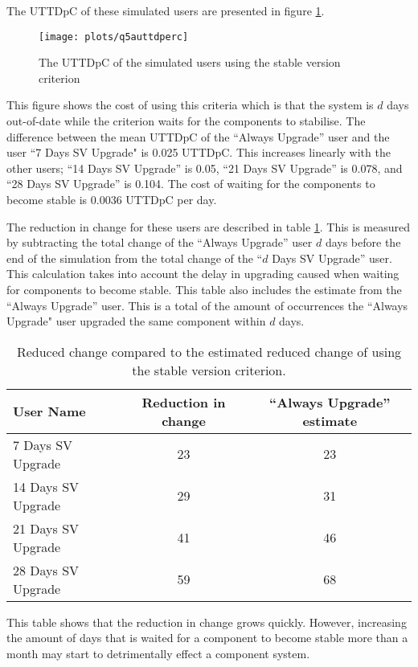 The UTTDpC of these simulated users are presented in figure \ref{exp.q5auttdperc}.
\begin{figure}[htp]
\begin{center}
  \texttt{[image: plots/q5auttdperc]}
  \caption{The UTTDpC of the simulated users using the stable version criterion}
  \label{exp.q5auttdperc}
\end{center}
\end{figure}

This figure shows the cost of using this criteria which is that the system is $d$ days out-of-date while the criterion waits for the components to stabilise.
The difference between the mean UTTDpC of the ``Always Upgrade'' user and the user ``7 Days SV Upgrade" is 0.025 UTTDpC.
This increases linearly with the other users; ``14 Days SV Upgrade'' is 0.05, ``21 Days SV Upgrade'' is 0.078, and ``28 Days SV Upgrade'' is 0.104.
The cost of waiting for the components to become stable is 0.0036 UTTDpC per day.

The reduction in change for these users are described in table \ref{exp.tblsvchange}.
This is measured by subtracting the total change of the ``Always Upgrade'' user $d$ days before the end of the simulation
from the total change of the  ``$d$ Days SV Upgrade'' user.
This calculation takes into account the delay in upgrading caused when waiting for components to become stable.
This table also includes the estimate from the ``Always Upgrade'' user.
This is a total of the amount of occurrences the ``Always Upgrade" user upgraded the same component within $d$ days.
\begin{table}[h!]
\centering
\begin{tabular}{|l | c | c | }
\hline
User Name 				& Reduction in change 	& ``Always Upgrade'' estimate		\\ \hline
7 Days SV Upgrade		& 23 					& 23 			 \\
14 Days SV Upgrade		& 29	 				& 31			\\
21 Days SV Upgrade		& 41 					& 46 			 \\
28 Days SV Upgrade 		& 59 					& 68			\\ \hline
\end{tabular}
\caption{Reduced change compared to the estimated reduced change of using the stable version criterion.}
\label{exp.tblsvchange}
\end{table}

This table shows that the reduction in change grows quickly.
However, increasing the amount of days that is waited for a component to become stable more than a month may start to detrimentally effect a component system.

